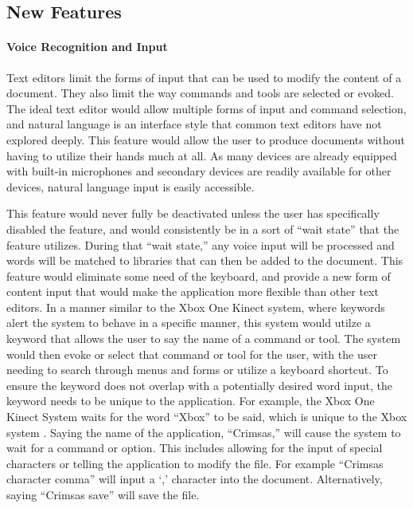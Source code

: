 \documentclass[11pt, oneside]{article}
\begin{document}
\subsection{New Features}
\paragraph{Voice Recognition and Input}
Text editors limit the forms of input that can be used to modify the content of a document. They also limit the way commands and tools are selected or evoked. The ideal text editor would allow multiple forms of input and command selection, and natural language is an interface style that common text editors have not explored deeply. This feature would allow the user to produce documents without having to utilize their hands much at all. As many devices are already equipped with built-in microphones and secondary devices are readily available for other devices, natural language input is easily accessible. 

This feature would never fully be deactivated unless the user has specifically disabled the feature, and would consistently be in a sort of ``wait state'' that the feature utilizes. During that ``wait state,'' any voice input will be processed and words will be matched to libraries that can then be added to the document. This feature would eliminate some need of the keyboard, and provide a new form of content input that would make the application more flexible than other text editors. In a manner similar to the Xbox One Kinect system, where keywords alert the system to behave in a specific manner, this system would utilze a keyword that allows the user to say the name of a command or tool. The system would then evoke or select that command or tool for the user, with the user needing to search through menus and forms or utilize a keyboard shortcut. To ensure the keyword does not overlap with a potentially desired word input, the keyword needs to be unique to the application. For example, the Xbox One Kinect System waits for the word ``Xbox'' to be said, which is unique to the Xbox system \cite{Xbox}. Saying the name of the application, ``Crimsas,'' will cause the system to wait for a command or option. This includes allowing for the input of special characters or telling the application to modify the file. For example ``Crimsas character comma'' will input a `,' character into the document. Alternatively, saying ``Crimsas save'' will save the file.
\end{document}
